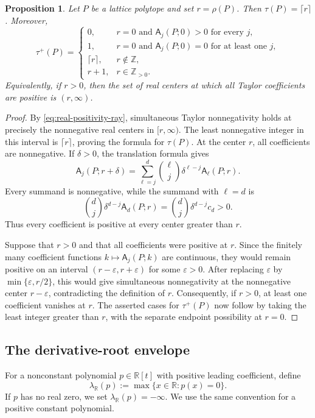 \documentclass[reqno, 12pt]{article}
\numberwithin{equation}{section}
\newtheorem{proposition}[theorem]{Proposition}
\theoremstyle{definition}
\newcommand{\R}{\mathbb{R}}
\newcommand{\Z}{\mathbb{Z}}
\newcommand{\A}{\mathsf{A}}
\begin{document}
\begin{proposition}\label{prop:natural-rounding}
Let $P$ be a lattice polytope and set $r=\rho(P)$.  Then $\tau(P)=\lceil r\rceil$.
Moreover,
\[\tau^+(P)=
 \begin{cases}
  0,&r=0\text{ and }\A_j(P;0)>0\text{ for every }j,\\
  1,&r=0\text{ and }\A_j(P;0)=0\text{ for at least one }j,\\
  \lceil r\rceil,&r\notin\Z,\\
  r+1,&r\in\Z_{>0}.
 \end{cases}
\]
Equivalently, if $r>0$, then the set of real centers at which all Taylor coefficients are positive is $(r,\infty)$.
\end{proposition}
\begin{proof}
By \eqref{eq:real-positivity-ray}, simultaneous Taylor nonnegativity holds
at precisely the nonnegative real centers in $[r,\infty)$.  The least
nonnegative integer in this interval is $\lceil r\rceil$, proving the
formula for $\tau(P)$.
At the center $r$, all coefficients are nonnegative.  If $\delta>0$, the
translation formula gives
\[\A_j(P;r+\delta)=\sum_{\ell=j}^{d}\binom{\ell}{j}\delta^{\ell-j}\A_\ell(P;r).
\]
Every summand is nonnegative, while the summand with $\ell=d$ is
\[\binom{d}{j}\delta^{d-j}\A_d(P;r)=\binom{d}{j}\delta^{d-j}c_d>0.
\]
Thus every coefficient is positive at every center greater than $r$.

Suppose that $r>0$ and that all coefficients were positive at $r$.  Since the finitely many coefficient functions
$k\mapsto\A_j(P;k)$ are continuous, they would remain positive on an interval $(r-\varepsilon,r+\varepsilon)$ for some $\varepsilon>0$. After replacing $\varepsilon$ by $\min\{\varepsilon,r/2\}$, this would give simultaneous nonnegativity at the nonnegative center $r-\varepsilon$, contradicting the definition of $r$.  Consequently, if $r>0$, at least one coefficient vanishes at $r$.  The asserted cases for $\tau^+(P)$ now follow by taking the least integer greater than $r$, with the separate endpoint possibility at $r=0$.
\end{proof}


\subsection{The derivative-root envelope}

For a nonconstant polynomial $p\in\R[t]$ with positive leading coefficient,
define
\[\lambda_{\R}(p):=\max\{x\in\R:p(x)=0\}.
\]
If $p$ has no real zero, we set $\lambda_{\R}(p)=-\infty$.  We use the same
convention for a positive constant polynomial.
\end{document}
